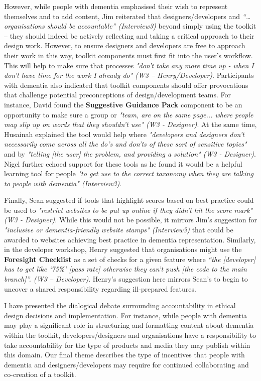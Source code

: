 However, while people with dementia emphasised their wish to represent themselves and to add content, Jim reiterated that designers/developers and \textit{“… organisations should be accountable” (Interview3)} beyond simply using the toolkit – they should indeed be actively reflecting and taking a critical approach to their design work. However, to ensure designers and developers are free to approach their work in this way, toolkit components must first fit into the user's workflow. This will help to make sure that processes \textit{"don't take any more time up - when I don't have time for the work I already do" (W3 – Henry/Developer)}. Participants with dementia also indicated that toolkit components should offer provocations that challenge potential preconceptions of design/development teams. For instance, David found the \textbf{Suggestive Guidance Pack }component to be an opportunity to make sure a group or \textit{"team, are on the same page... where people may slip up on words that they shouldn't use" (W3 - Designer)}. At the same time, Husainah explained the tool would help where \textit{"developers and designers don't necessarily come across all the do's and don'ts of these sort of sensitive topics"} and by \textit{"telling [the user] the problem, and providing a solution" (W3 - Designer)}. Nigel further echoed support for these tools as he found it would be a helpful learning tool for people \textit{"to get use to the correct taxonomy when they are talking to people with dementia" (Interview3)}. 

Finally, Sean suggested if tools that highlight scores based on best practice could be used to \textit{"restrict websites to be put up online if they didn't hit the score mark" (W3 - Designer)}. While this would not be possible, it mirrors Jim's suggestion for \textit{"inclusive or dementia-friendly website stamps" (Interview3)} that could be awarded to websites achieving best practice in dementia representation. Similarly, in the developer workshop, Henry suggested that organisations might use the \textbf{Foresight Checklist} as a set of checks for a given feature where\textit{ “the [developer] has to get like ‘75\%’ [pass rate] otherwise they can’t push [the code to the main branch]”. (W3 – Developer)}. Henry’s suggestion here mirrors Sean’s to begin to uncover a shared responsibility regarding ill-prepared features.

I have presented the dialogical debate surrounding accountability in ethical design decisions and implementation. For instance, while people with dementia may play a significant role in structuring and formatting content about dementia within the toolkit, developers/designers and organisations have a responsibility to take accountability for the type of products and media they may publish within this domain. Our final theme describes the type of incentives that people with dementia and designers/developers may require for continued collaborating and co-creation of a toolkit.

